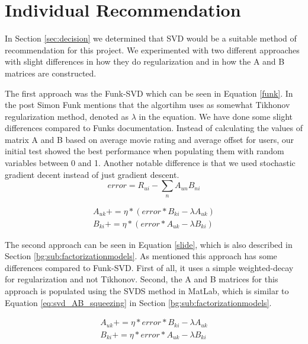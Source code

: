 \section{Individual Recommendation}\label{sec:individual_recommendation}
In Section \ref{sec:decision} we determined that SVD would be a suitable method of recommendation for this project. 
We experimented with two different approaches with slight differences in how they do regularization and in how the A and B matrices are constructed.

The first approach was the Funk-SVD which can be seen in Equation \ref{funk}\cite{svdsimonfunk}. In the post Simon Funk mentions that the algortihm uses as somewhat Tikhonov regularization method, denoted as $\lambda$ in the equation. We have done some slight differences compared to Funks documentation\cite{svdsimonfunk}. Instead of calculating the values of matrix A and B based on average movie rating and average offset for users, our initial test showed the best performance when populating them with random variables between 0 and 1. Another notable difference is that we used stochastic gradient decent instead of just gradient descent.
\begin{equation}
error = R_{ui} - \sum_n A_{un}B_{ni}
\end{equation}

\begin{equation}\label{funk}
\begin{aligned}
A_{uk} += \eta * (error * B_{ki} - \lambda A_{uk}) \\
B_{ki} += \eta * (error * A_{uk} - \lambda B_{ki})
\end{aligned}
\end{equation}

The second approach can be seen in Equation \ref{slide}, which is also described in Section \ref{bg:sub:factorizationmodels}. As mentioned this approach has some differences compared to Funk-SVD. First of all, it uses a simple weighted-decay for regularization and not Tikhonov. Second, the A and B matrices for this approach is populated using the SVDS method in MatLab, which is similar to Equation \ref{eq:svd_AB_squeezing} in Section \ref{bg:sub:factorizationmodels}.

\begin{equation}\label{slides}
\begin{aligned}
A_{uk} += \eta * error *B_{ki} - \lambda A_{uk} \\
B_{ki} += \eta * error *A_{uk} - \lambda B_{ki} 
\end{aligned}
\end{equation}

